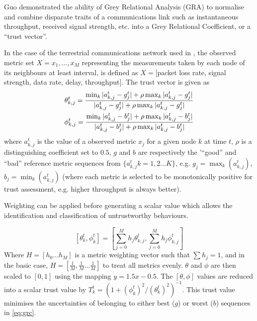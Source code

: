 \documentclass[runningheads,a4paper]{llncs}
\begin{document}
Guo\cite{Guo11} demonstrated the ability of Grey Relational Analysis (GRA)\cite{Zuo1995} to normalise and combine disparate traits of a communications link such as instantaneous throughput, received signal strength, etc. into a Grey Relational Coefficient, or a ``trust vector''.

In the case of the terrestrial communications network used in \cite{Guo11}, the observed metric set $X = {x_1,\dots,x_M}$ representing the measurements taken by each node of its neighbours at least interval, is defined as $X=[$packet loss rate, signal strength, data rate, delay, throughput$]$.
The trust vector is given as
%
\begin{align}
  \label{eq:grc}
  \theta_{k,j}^t = \frac{\min_k|a_{k,j}^t - g_j^t| + \rho \max_k|a_{k,j}^t-g_j^t|}{|a_{k,j}^t-g_j^t| + \rho \max_k|a_{k,j}^t-g_j^t|} \\
  \phi_{k,j}^t = \frac{\min_k|a_{k,j}^t - b_j^t| + \rho \max_k|a_{k,j}^t-b_j^t|}{|a_{k,j}^t-b_j^t| + \rho \max_k|a_{k,j}^t-b_j^t|} \notag 
\end{align}
%
where $a_{k,j}^t$ is the value of a observed metric $x_j$ for a given node $k$ at time $t$, $\rho$ is a distinguishing coefficient set to $0.5$, $g$ and $b$ are respectively the '``good'' and ``bad'' reference metric sequences from $\{a_{k,j}^t k=1,2\dots K\}$, e.g. $g_j=\max_k({a_{k,j}^t})$,  $b_j=\min_k({a_{k,j}^t})$ (where each metric is selected to be monotonically positive for trust assessment, e.g. higher throughput is always better). 

Weighting can be applied before generating a scalar value which allows the identification and classification of untrustworthy behaviours.

%
\begin{equation}
  \label{eq:metric_weighting}
  [\theta_k^t, \phi_k^t] = \left[\sum_{j=0}^M h_j \theta_{k,j}^t,\sum_{j=0}^M h_j \phi_{k,j}^t \right]
\end{equation}
Where $H=[h_0\dots h_M]$ is a metric weighting vector such that $\sum h_j = 1$, and in the basic case, $H=[\frac{1}{M},\frac{1}{M}\dots\frac{1}{M}]$ to treat all metrics evenly.
$\theta$ and $\phi$ are then scaled to $[0,1]$ using the mapping $y = 1.5 x - 0.5$.
The $[\theta,\phi]$ values are reduced into a scalar trust value by $T_k^t = ({1+{(\phi_k^t)^2}/{(\theta_k^t)^2}})^{-1}$.
This trust value minimises the uncertainties of belonging to either best ($g$) or worst ($b$) sequences in \eqref{eq:grc}.
\end{document}
